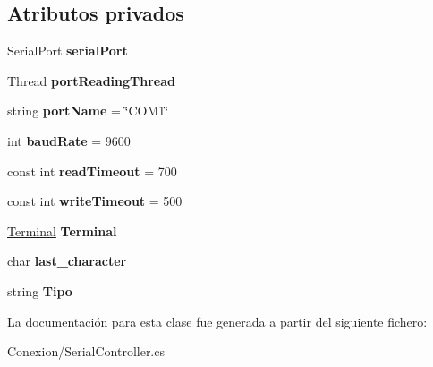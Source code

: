 \subsection*{Atributos privados}
\begin{DoxyCompactItemize}
\item 
\mbox{\label{class_serial_controller_ac209acf5fae32ccff498c6d0349f999b}} 
Serial\+Port {\bfseries serial\+Port}
\item 
\mbox{\label{class_serial_controller_aec57f1d1f3dc7cfc4161808fa22bdc0b}} 
Thread {\bfseries port\+Reading\+Thread}
\item 
\mbox{\label{class_serial_controller_afd06697d77f9bf30567820f957c5dca6}} 
string {\bfseries port\+Name} = \char`\"{}C\+O\+M1\char`\"{}
\item 
\mbox{\label{class_serial_controller_a96535d826c1065405c906c8a15f332bc}} 
int {\bfseries baud\+Rate} = 9600
\item 
\mbox{\label{class_serial_controller_a7c6efb78ecdd810eb56e5162a2d600e8}} 
const int {\bfseries read\+Timeout} = 700
\item 
\mbox{\label{class_serial_controller_a32bc9e356c0b88b37086b62a2db45c6d}} 
const int {\bfseries write\+Timeout} = 500
\item 
\mbox{\label{class_serial_controller_a54863ac160f11e91f47e14a39a9abae7}} 
\mbox{\hyperlink{class_command_terminal_1_1_terminal}{Terminal}} {\bfseries Terminal}
\item 
\mbox{\label{class_serial_controller_a0aef373369fb1951891e369e12432446}} 
char {\bfseries last\+\_\+character}
\item 
\mbox{\label{class_serial_controller_a472102a600c33bf8ae06a72878213217}} 
string {\bfseries Tipo}
\end{DoxyCompactItemize}


La documentación para esta clase fue generada a partir del siguiente fichero\+:\begin{DoxyCompactItemize}
\item 
Conexion/Serial\+Controller.\+cs\end{DoxyCompactItemize}
